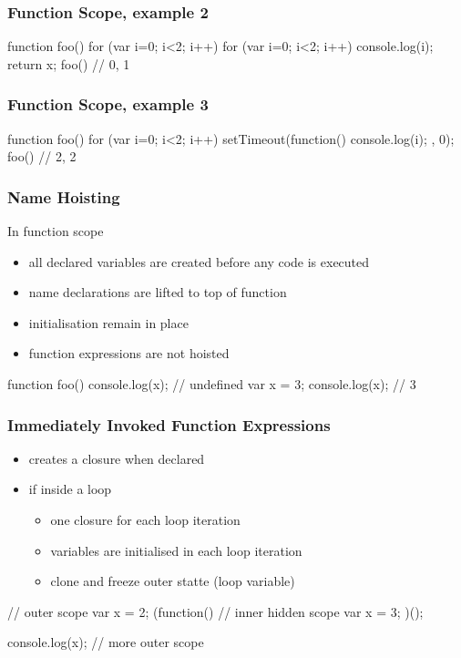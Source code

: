 \begin{frame}[fragile] \frametitle{Function Scope, example 2}

\begin{CodeBox}{}
function foo() {
  for (var i=0; i<2; i++) {
    for (var i=0; i<2; i++) {
      console.log(i);
    }
  }
  return x;
}
foo()  // 0, 1
\end{CodeBox}
\end{frame}

\begin{frame}[fragile] \frametitle{Function Scope, example 3}

\begin{CodeBox}{}
function foo() {
  for (var i=0; i<2; i++) {
    setTimeout(function(){ console.log(i); }, 0);
  }
}
foo()  // 2, 2
\end{CodeBox}
\end{frame}

\begin{frame}[fragile] \frametitle{Name Hoisting}
In function scope
\begin{itemize}
  \item all declared variables are created before any code is executed
  \item name declarations are lifted to top of function
  \item initialisation remain in place
  \item function expressions are not hoisted
\end{itemize}

\begin{CodeBox}{}
function foo() {
  console.log(x);  // undefined
  var x = 3;
  console.log(x);  // 3
}
\end{CodeBox}
\end{frame}

\begin{frame}[fragile] \frametitle{Immediately Invoked Function Expressions}
\begin{itemize}
  \item creates a closure when declared
  \item if inside a loop
  \begin{itemize}
    \item one closure for each loop iteration
    \item variables are initialised in each loop iteration
    \item clone and freeze outer statte (loop variable)
  \end{itemize}
\end{itemize}

\begin{CodeBox}{}
// outer scope
var x = 2;
(function() {
  // inner hidden scope
  var x = 3;
})();

console.log(x);
// more outer scope
\end{CodeBox}
\end{frame}

